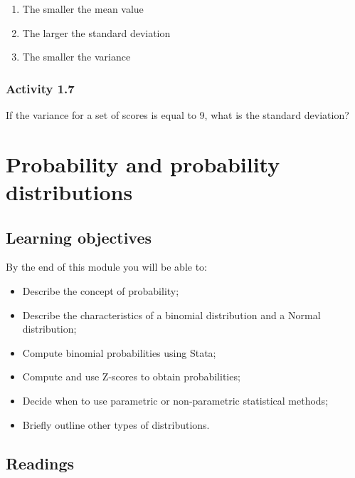 \documentclass[
]{memoir}
\providecommand{\tightlist}{%
  \setlength{\itemsep}{0pt}\setlength{\parskip}{0pt}}
\begin{document}
\begin{enumerate}
\def\labelenumi{\alph{enumi})}
\tightlist
\item
  The smaller the mean value
\item
  The larger the standard deviation
\item
  The smaller the variance
\end{enumerate}

\hypertarget{activity-1.7}{%
\subsection*{Activity 1.7}\label{activity-1.7}}

If the variance for a set of scores is equal to 9, what is the standard deviation?

\hypertarget{probability-and-probability-distributions}{%
\chapter{Probability and probability distributions}\label{probability-and-probability-distributions}}

\hypertarget{learning-objectives-1}{%
\section*{Learning objectives}\label{learning-objectives-1}}

By the end of this module you will be able to:

\begin{itemize}
\tightlist
\item
  Describe the concept of probability;
\item
  Describe the characteristics of a binomial distribution and a Normal distribution;
\item
  Compute binomial probabilities using Stata;
\item
  Compute and use Z-scores to obtain probabilities;
\item
  Decide when to use parametric or non-parametric statistical methods;
\item
  Briefly outline other types of distributions.
\end{itemize}

\hypertarget{readings-1}{%
\section*{Readings}\label{readings-1}}
\end{document}
